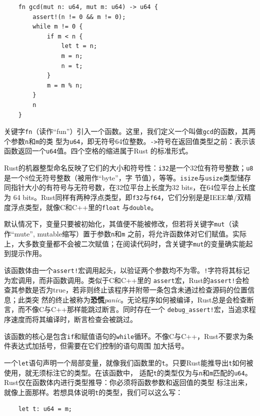 \medskip
\begin{verbatim}
    fn gcd(mut n: u64, mut m: u64) -> u64 {
        assert!(n != 0 && m != 0);
        while m != 0 {
            if m < n {
                let t = n;
                m = n;
                n = t;
            }
            m = m % n;
        }
        n
    }
\end{verbatim}

关键字\texttt{fn}（读作``fun''）引入一个函数。这里，我们定义一个叫做\texttt{gcd}的函数，其两个参数\texttt{n}和\texttt{m}的类
型为\texttt{u64}，即无符号64位整数。\texttt{->}符号在返回值类型之前：表示该函数返回一个\texttt{u64}值。四个空格的缩进属于Rust
的标准形式。

\medskip
Rust的机器整型命名反映了它们的大小和符号性：\texttt{i32}是一个32位有符号整数；\texttt{u8}是一个8位无符号整数（被用作``byte''，字
节值），等等。\texttt{isize}与\texttt{usize}类型储存同指针大小的有符号与无符号数，在32位平台上长度为32 bits，在64位平台上长度为
64 bits。Rust同样有两种浮点类型，即\texttt{f32}与\texttt{f64}，它们分别是是IEEE单/双精度浮点类型，就像C和C++里的\texttt{float}
与\texttt{double}。

\medskip
默认情况下，变量只要被初始化，其值便不能被修改，但若将关键字\texttt{mut}（读作``mute'', mutable缩写）置于参数\texttt{n}和\texttt{m}
之前，将允许函数体对它们赋值。实际上，大多数变量都不会被二次赋值；在阅读代码时，含关键字\texttt{mut}的变量确实能起到提示作用。

\medskip
该函数体由一个\texttt{assert!}宏调用起头，以验证两个参数均不为零。\texttt{!}字符将其标记为宏调用，而非函数调用。类似于C和C++里的
\texttt{assert}宏，Rust的\texttt{assert!}会检查其参数是否为true，若非则终止该程序并附带一条包含未通过检查源码的位置信息；此类突
然的终止被称为\textbf{恐慌}\textit{panic}。无论程序如何被编译，Rust总是会检查断言，而不像C与C++那样能跳过断言。同时存在一个
\texttt{debug\_assert!}宏，当追求程序速度而将其编译时，断言检查会被跳过。

\medskip
该函数的核心是包含\texttt{if}和赋值语句的\texttt{while}循环。不像C与C++，Rust不要求为条件表达式加括号，但需要在它们控制的语句周围
加大括号。

\medskip
一个\texttt{let}语句声明一个局部变量，就像我们函数里的\texttt{t}。只要Rust能推导出\texttt{t}如何被使用，就无须标注它的类型。在该函数中，
适配\texttt{t}的类型仅为与\texttt{n}和\texttt{m}匹配的\texttt{u64}。Rust仅在函数体内进行类型推导：你必须将函数参数和返回值的类型
标注出来，就像上面那样。若想具体说明\texttt{t}的类型，我们可以这么写：
\begin{verbatim}
    let t: u64 = m;
\end{verbatim}

